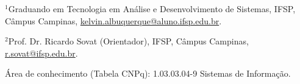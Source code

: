 \begingroup
    \fontsize{9pt}{11pt}\selectfont
    \sloppy
  
  $^1$Graduando em Tecnologia em Análise e Desenvolvimento de Sistemas, IFSP, Câmpus Campinas, \url{kelvin.albuquerque@aluno.ifsp.edu.br}.
  
  $^2$Prof. Dr. Ricardo Sovat (Orientador), IFSP, Câmpus Campinas, \url{r.sovat@ifsp.edu.br}.

  \vspace{0.2cm}
  \noindent Área de conhecimento (Tabela CNPq): 1.03.03.04-9 Sistemas de Informação. 
\endgroup

